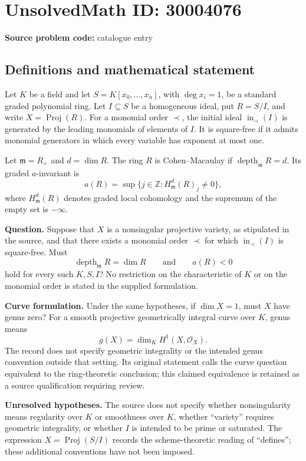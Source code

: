 \documentclass[11pt]{article}
\newcommand{\Z}{\mathbb{Z}}
\begin{document}
\section*{UnsolvedMath ID: 30004076}
\textbf{Source problem code:} catalogue entry
\subsection{Definitions and mathematical statement}
Let \(K\) be a field and let \(S=K[x_0,\ldots,x_n]\), with \(\deg x_i=1\), be a standard graded polynomial ring. Let \(I\subseteq S\) be a homogeneous ideal, put \(R=S/I\), and write \(X=\operatorname{Proj}(R)\). For a monomial order \(\prec\), the initial ideal \(\operatorname{in}_{\prec}(I)\) is generated by the leading monomials of elements of \(I\). It is square-free if it admits monomial generators in which every variable has exponent at most one.

Let \(\mathfrak m=R_+\) and \(d=\dim R\). The ring \(R\) is Cohen--Macaulay if \(\operatorname{depth}_{\mathfrak m}R=d\). Its graded \(a\)-invariant is
\[
 a(R)=\sup\{j\in\Z:H^d_{\mathfrak m}(R)_j\ne0\},
\]
where \(H^d_{\mathfrak m}(R)\) denotes graded local cohomology and the supremum of the empty set is \(-\infty\).

\textbf{Question.} Suppose that \(X\) is a nonsingular projective variety, as stipulated in the source, and that there exists a monomial order \(\prec\) for which \(\operatorname{in}_{\prec}(I)\) is square-free. Must
\[
 \operatorname{depth}_{\mathfrak m}R=\dim R
 \qquad\text{and}\qquad a(R)<0
\]
hold for every such \(K,S,I\)? No restriction on the characteristic of \(K\) or on the monomial order is stated in the supplied formulation.

\textbf{Curve formulation.} Under the same hypotheses, if \(\dim X=1\), must \(X\) have genus zero? For a smooth projective geometrically integral curve over \(K\), genus means
\[
 g(X)=\dim_K H^1(X,\mathcal O_X).
\]
The record does not specify geometric integrality or the intended genus convention outside that setting. Its original statement calls the curve question equivalent to the ring-theoretic conclusion; this claimed equivalence is retained as a source qualification requiring review.

\textbf{Unresolved hypotheses.} The source does not specify whether nonsingularity means regularity over \(K\) or smoothness over \(K\), whether ``variety'' requires geometric integrality, or whether \(I\) is intended to be prime or saturated. The expression \(X=\operatorname{Proj}(S/I)\) records the scheme-theoretic reading of ``defines''; these additional conventions have not been imposed.
\end{document}
